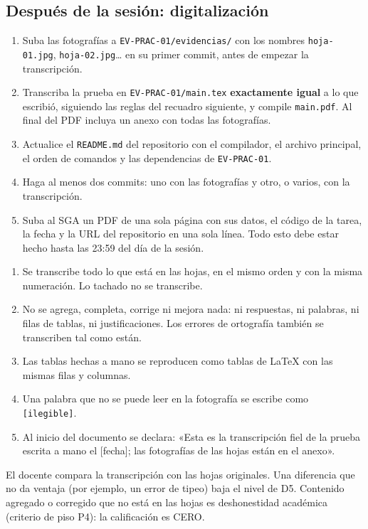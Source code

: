 \documentclass[11pt]{article}
\newcommand{\subseccion}[1]{\subsection{\textcolor{midblue}{#1}}}
\begin{document}
\subseccion{Después de la sesión: digitalización}

\begin{enumerate}[leftmargin=18pt,itemsep=2pt]
	\item Suba las fotografías a \texttt{EV-PRAC-01/evidencias/} con los nombres \texttt{hoja-01.jpg}, \texttt{hoja-02.jpg}\ldots{} en su primer commit, antes de empezar la transcripción.
	\item Transcriba la prueba en \texttt{EV-PRAC-01/main.tex} \textbf{exactamente igual} a lo que escribió, siguiendo las reglas del recuadro siguiente, y compile \texttt{main.pdf}. Al final del PDF incluya un anexo con todas las fotografías.
	\item Actualice el \texttt{README.md} del repositorio con el compilador, el archivo principal, el orden de comandos y las dependencias de \texttt{EV-PRAC-01}.
	\item Haga al menos dos commits: uno con las fotografías y otro, o varios, con la transcripción.
	\item Suba al SGA un PDF de una sola página con sus datos, el código de la tarea, la fecha y la URL del repositorio en una sola línea. Todo esto debe estar hecho hasta las 23:59 del día de la sesión.
\end{enumerate}

\begin{cajaaviso}[title={Reglas de la transcripción fiel}]
	\begin{enumerate}[label=\textbf{R\arabic*.},leftmargin=24pt,itemsep=2pt]
		\item Se transcribe todo lo que está en las hojas, en el mismo orden y con la misma numeración. Lo tachado no se transcribe.
		\item No se agrega, completa, corrige ni mejora nada: ni respuestas, ni palabras, ni filas de tablas, ni justificaciones. Los errores de ortografía también se transcriben tal como están.
		\item Las tablas hechas a mano se reproducen como tablas de \LaTeX{} con las mismas filas y columnas.
		\item Una palabra que no se puede leer en la fotografía se escribe como \texttt{[ilegible]}.
		\item Al inicio del documento se declara: «Esta es la transcripción fiel de la prueba escrita a mano el [fecha]; las fotografías de las hojas están en el anexo».
	\end{enumerate}
	El docente compara la transcripción con las hojas originales. Una diferencia que no da ventaja (por ejemplo, un error de tipeo) baja el nivel de D5. Contenido agregado o corregido que no está en las hojas es deshonestidad académica (criterio de piso P4): la calificación es CERO.
\end{cajaaviso}
\end{document}

